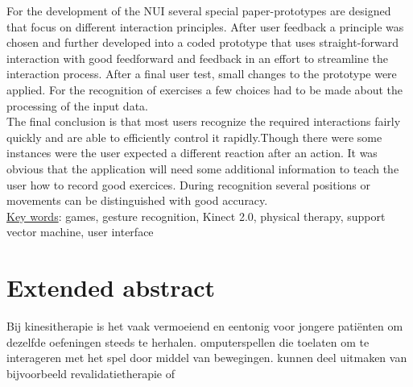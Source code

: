 For the development of the NUI several special paper-prototypes are designed that focus on different interaction principles. After user feedback a principle was chosen and further developed into a coded prototype that uses straight-forward interaction with good feedforward and feedback in an effort to streamline the interaction process. After a final user test, small changes to the prototype were applied. For the recognition of exercises a few choices had to be made about the processing of the input data.\\


The final conclusion is that most users recognize the required interactions fairly quickly and are able to efficiently control it rapidly.Though there were some instances were the user expected a different reaction after an action. It was obvious that the application will need some additional information to teach the user how to record good exercices. During recognition several positions or movements can be distinguished with good accuracy. \\


\underline{Key words}: games, gesture recognition, Kinect 2.0, physical therapy, support vector machine, user interface


\chapter*{Extended abstract}

Bij kinesitherapie is het vaak vermoeiend en eentonig voor jongere pati\"enten om dezelfde oefeningen steeds te herhalen. omputerspellen die toelaten om te interageren met het spel door middel van bewegingen. kunnen deel uitmaken van bijvoorbeeld revalidatietherapie of 